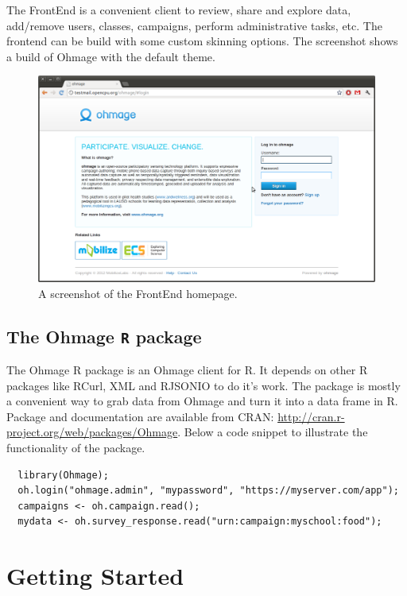 \documentclass{scrartcl}
\begin{document}
\noindent The FrontEnd is a convenient client to review, share and explore data,
add/remove users, classes, campaigns, perform administrative tasks, etc. The
frontend can be build with some custom skinning options. The screenshot shows a build of
Ohmage with the default theme.

\begin{figure}[h!]
\begin{center}
\includegraphics[width=15cm]{frontend.png}
\caption{A screenshot of the FrontEnd homepage.}
\label{fig:frontend}
\end{center}
\end{figure}

\subsection{The Ohmage \texttt{R} package}

The Ohmage R package is an Ohmage client for R. It depends on other R packages
like RCurl, XML and RJSONIO to do it's work. The package is mostly a convenient
way to grab data from Ohmage and turn it into a data frame in R. Package and
documentation are available from CRAN:
\url{http://cran.r-project.org/web/packages/Ohmage}. Below a code snippet to
illustrate the functionality of the package.

\begin{verbatim}
  library(Ohmage);
  oh.login("ohmage.admin", "mypassword", "https://myserver.com/app");
  campaigns <- oh.campaign.read();
  mydata <- oh.survey_response.read("urn:campaign:myschool:food");
\end{verbatim}

\section{Getting Started}
\end{document}

